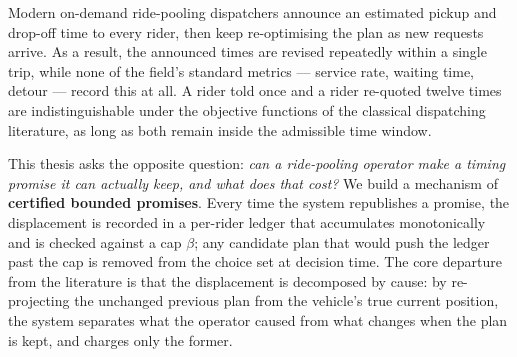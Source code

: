 Modern on-demand ride-pooling dispatchers announce an estimated pickup and drop-off time to
every rider, then keep re-optimising the plan as new requests arrive. As a result, the
announced times are revised repeatedly within a single trip, while none of the field's
standard metrics --- service rate, waiting time, detour --- record this at all. A rider told
once and a rider re-quoted twelve times are indistinguishable under the objective functions of
the classical dispatching literature, as long as both remain inside the admissible time window.

This thesis asks the opposite question: \emph{can a ride-pooling operator make a timing
promise it can actually keep, and what does that cost?} We build a mechanism of
\textbf{certified bounded promises}. Every time the system republishes a promise, the
displacement is recorded in a per-rider ledger that accumulates monotonically and is checked
against a cap $\beta$; any candidate plan that would push the ledger past the cap is removed
from the choice set at decision time. The core departure from the literature is that the
displacement is decomposed by cause: by re-projecting the unchanged previous plan from the
vehicle's true current position, the system separates what the operator caused from what
changes when the plan is kept, and charges only the former.

